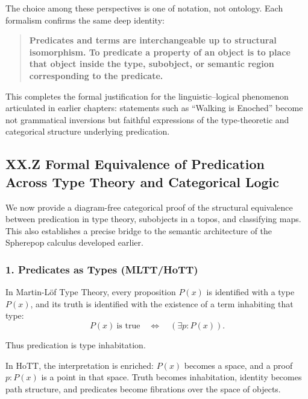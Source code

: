 \documentclass[12pt,letterpaper]{article}
\begin{document}
The choice among these perspectives is one of notation, not ontology.  Each
formalism confirms the same deep identity:

\begin{quote}
\textbf{Predicates and terms are interchangeable up to structural isomorphism.  
To predicate a property of an object is to place that object inside the  
type, subobject, or semantic region corresponding to the predicate.}
\end{quote}

This completes the formal justification for the linguistic–logical phenomenon
articulated in earlier chapters: statements such as “Walking is Enoched” become
not grammatical inversions but faithful expressions of the type-theoretic and
categorical structure underlying predication.

\subsection{XX.Z Formal Equivalence of Predication Across Type Theory and Categorical Logic}

We now provide a diagram-free categorical proof of the structural equivalence
between predication in type theory, subobjects in a topos, and classifying maps.
This also establishes a precise bridge to the semantic architecture of the
Spherepop calculus developed earlier.

\subsubsection*{1. Predicates as Types (MLTT/HoTT)}

In Martin-Löf Type Theory, every proposition $P(x)$ is identified with a type
$P(x)$, and its truth is identified with the existence of a term inhabiting that
type:
\[
P(x)\ \text{is true} \quad\Longleftrightarrow\quad (\exists p : P(x)).
\]

Thus predication is type inhabitation.

In HoTT, the interpretation is enriched: $P(x)$ becomes a space, and a proof
$p : P(x)$ is a point in that space.  Truth becomes inhabitation, identity
becomes path structure, and predicates become fibrations over the space of
objects.
\end{document}
